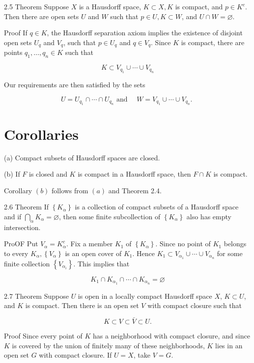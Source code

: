 \documentclass[10pt]{article}
\begin{document}
2.5 Theorem Suppose $X$ is a Hausdorff space, $K \subset X, K$ is compact, and $p \in K^{c}$. Then there are open sets $U$ and $W$ such that $p \in U, K \subset W$, and $U \cap W=\varnothing$.

Proof If $q \in K$, the Hausdorff separation axiom implies the existence of disjoint open sets $U_{q}$ and $V_{q}$, such that $p \in U_{q}$ and $q \in V_{q}$. Since $K$ is compact, there are points $q_{1}, \ldots, q_{n} \in K$ such that

$$
K \subset V_{q_{1}} \cup \cdots \cup V_{q_{n}}
$$

Our requirements are then satisfied by the sets

$$
U=U_{q_{1}} \cap \cdots \cap U_{q_{n}} \text { and } \quad W=V_{q_{1}} \cup \cdots \cup V_{q_{n}} \text {. }
$$

\section{Corollaries}
(a) Compact subsets of Hausdorff spaces are closed.

(b) If $F$ is closed and $K$ is compact in a Hausdorff space, then $F \cap K$ is compact.

Corollary $(b)$ follows from $(a)$ and Theorem 2.4.

2.6 Theorem If $\left\{K_{\alpha}\right\}$ is a collection of compact subsets of a Hausdorff space and if $\bigcap_{\alpha} K_{\alpha}=\varnothing$, then some finite subcollection of $\left\{K_{\alpha}\right\}$ also has empty intersection.

ProOF Put $V_{\alpha}=K_{\alpha}^{c}$. Fix a member $K_{1}$ of $\left\{K_{\alpha}\right\}$. Since no point of $K_{1}$ belongs to every $K_{\alpha},\left\{V_{\alpha}\right\}$ is an open cover of $K_{1}$. Hence $K_{1} \subset V_{\alpha_{1}} \cup \cdots \cup V_{\alpha_{n}}$ for some finite collection $\left\{V_{\alpha_{i}}\right\}$. This implies that

$$
K_{1} \cap K_{\alpha_{1}} \cap \cdots \cap K_{\alpha_{n}}=\varnothing
$$

2.7 Theorem Suppose $U$ is open in a locally compact Hausdorff space $X$, $K \subset U$, and $K$ is compact. Then there is an open set $V$ with compact closure such that

$$
K \subset V \subset \bar{V} \subset U .
$$

Proof Since every point of $K$ has a neighborhood with compact closure, and since $K$ is covered by the union of finitely many of these neighborhoods, $K$ lies in an open set $G$ with compact closure. If $U=X$, take $V=G$.
\end{document}
